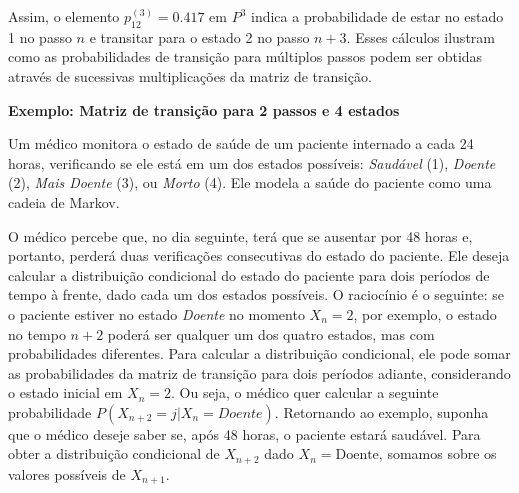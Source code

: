 \documentclass[12pt]{article}
\theoremstyle{break}
\begin{document}
Assim, o elemento \( p_{12}^{(3)} = 0.417 \) em \( P^3 \) indica a probabilidade de estar no estado 1 no passo \( n \) e transitar para o estado 2 no passo \( n+3 \). Esses cálculos ilustram como as probabilidades de transição para múltiplos passos podem ser obtidas através de sucessivas multiplicações da matriz de transição.







\textbf{Exemplo: Matriz de transição para 2 passos e 4 estados}


Um médico monitora o estado de saúde de um paciente internado a cada 24 horas, verificando se ele está em um dos estados possíveis: \textit{Saudável} (1), \textit{Doente} (2), \textit{Mais Doente} (3), ou \textit{Morto} (4). Ele modela a saúde do paciente como uma cadeia de Markov.


O médico percebe que, no dia seguinte, terá que se ausentar por 48 horas e, portanto, perderá duas verificações consecutivas do estado do paciente. Ele deseja calcular a distribuição condicional do estado do paciente para dois períodos de tempo à frente, dado cada um dos estados possíveis. O raciocínio é o seguinte: se o paciente estiver no estado \textit{Doente} no momento \( X_n = 2 \), por exemplo, o estado no tempo \( n+2 \) poderá ser qualquer um dos quatro estados, mas com probabilidades diferentes. Para calcular a distribuição condicional, ele pode somar as probabilidades da matriz de transição para dois períodos adiante, considerando o estado inicial em \( X_n = 2 \).  Ou seja, o médico quer calcular a seguinte probabilidade $P(X_{n+2} = j |X_{n} = Doente)$.
 Retornando ao exemplo, suponha que o médico deseje saber se, após 48 horas, o paciente estará saudável. Para obter a distribuição condicional de \( X_{n+2} \) dado \( X_n = \text{Doente} \), somamos sobre os valores possíveis de \( X_{n+1} \).


\end{document}

